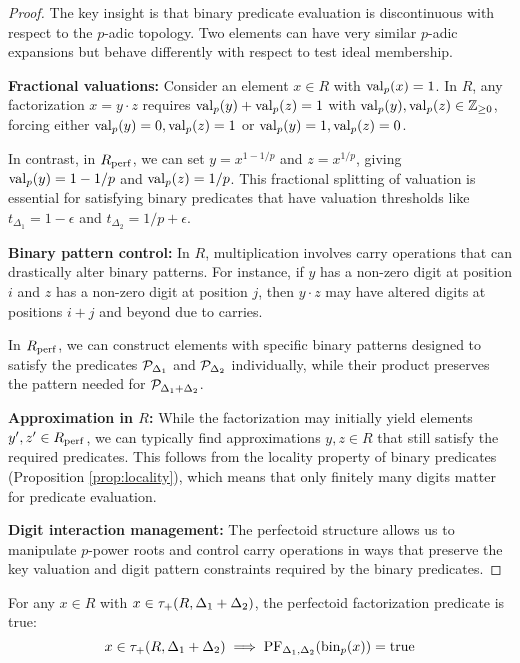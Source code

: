 \begin{proof}
The key insight is that binary predicate evaluation is discontinuous with respect to the $p$-adic topology. Two elements can have very similar $p$-adic expansions but behave differently with respect to test ideal membership.

\textbf{Fractional valuations:} Consider an element $x \in R$ with $\operatorname{val}_p(x) = 1$. In $R$, any factorization $x = y \cdot z$ requires $\operatorname{val}_p(y) + \operatorname{val}_p(z) = 1$ with $\operatorname{val}_p(y), \operatorname{val}_p(z) \in \mathbb{Z}_{\geq 0}$, forcing either $\operatorname{val}_p(y) = 0, \operatorname{val}_p(z) = 1$ or $\operatorname{val}_p(y) = 1, \operatorname{val}_p(z) = 0$. 

In contrast, in $R_{\operatorname{perf}}$, we can set $y = x^{1-1/p}$ and $z = x^{1/p}$, giving $\operatorname{val}_p(y) = 1-1/p$ and $\operatorname{val}_p(z) = 1/p$. This fractional splitting of valuation is essential for satisfying binary predicates that have valuation thresholds like $t_{\Delta_1} = 1-\epsilon$ and $t_{\Delta_2} = 1/p+\epsilon$.

\textbf{Binary pattern control:} In $R$, multiplication involves carry operations that can drastically alter binary patterns. For instance, if $y$ has a non-zero digit at position $i$ and $z$ has a non-zero digit at position $j$, then $y \cdot z$ may have altered digits at positions $i+j$ and beyond due to carries.

In $R_{\operatorname{perf}}$, we can construct elements with specific binary patterns designed to satisfy the predicates $\mathcal{P}_{\Delta_1}$ and $\mathcal{P}_{\Delta_2}$ individually, while their product preserves the pattern needed for $\mathcal{P}_{\Delta_1+\Delta_2}$.

\textbf{Approximation in $R$:} While the factorization may initially yield elements $y', z' \in R_{\operatorname{perf}}$, we can typically find approximations $y, z \in R$ that still satisfy the required predicates. This follows from the locality property of binary predicates (Proposition \ref{prop:locality}), which means that only finitely many digits matter for predicate evaluation.

\textbf{Digit interaction management:} The perfectoid structure allows us to manipulate $p$-power roots and control carry operations in ways that preserve the key valuation and digit pattern constraints required by the binary predicates.
\end{proof}

\begin{lemma}\label{lem:key-factorization}
For any $x \in R$ with $x \in \tau_+(R,\Delta_1+\Delta_2)$, the perfectoid factorization predicate is true:
$$x \in \tau_+(R,\Delta_1+\Delta_2) \implies \text{PF}_{\Delta_1, \Delta_2}(\operatorname{bin}_p(x)) = \text{true}$$
\end{lemma}

